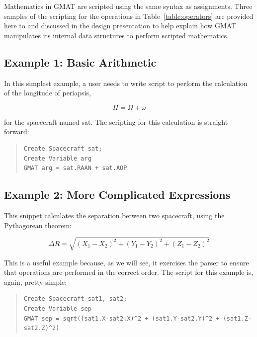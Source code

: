 Mathematics in GMAT are scripted using the same syntax as assignments.  Three
samples of the scripting for the operations in Table~\ref{table:operators} are
provided here to and discussed in the design presentation to help explain how
GMAT manipulates its internal data structures to perform scripted mathematics.

\subsection*{Example 1: Basic Arithmetic}
In this simplest example, a user needs to write script to perform the
calculation of the longitude of periapsis,

\begin{equation}\label{eq:mathLongPeri}
\Pi=\Omega+\omega
\end{equation}

\noindent for the spacecraft named sat.  The scripting for this calculation is
straight forward:

\begin{quote}
\begin{verbatim}
Create Spacecraft sat;
Create Variable arg
GMAT arg = sat.RAAN + sat.AOP
\end{verbatim}
\end{quote}

\subsection*{Example 2: More Complicated Expressions}

This snippet calculates the separation between two spacecraft, using the
Pythagorean theorem:

\begin{equation}\label{eq:mathSatSep}
\Delta R = \sqrt{(X_1 - X_2)^2 + (Y_1 - Y_2)^2 + (Z_1 - Z_2)^2}
\end{equation}

\noindent This is a useful example because, as we will see, it exercises the
parser to ensure that operations are performed in the correct order.  The
script for this example is, again, pretty simple:

\begin{quote}
\begin{verbatim}
Create Spacecraft sat1, sat2;
Create Variable sep
GMAT sep = sqrt((sat1.X-sat2.X)^2 + (sat1.Y-sat2.Y)^2 + (sat1.Z-sat2.Z)^2)
\end{verbatim}
\end{quote}

